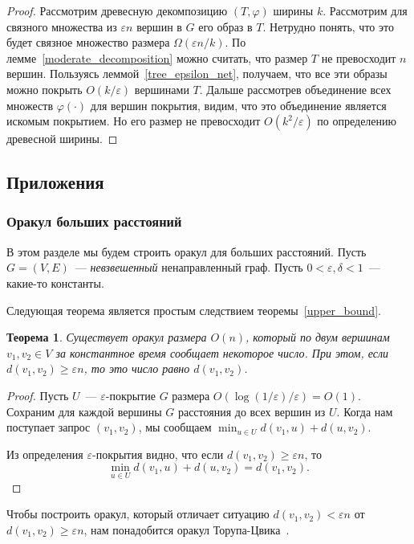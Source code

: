 \documentclass[12pt]{article}
\newcommand{\eps}{\varepsilon}
\newtheorem{theorem}{Теорема}
\begin{document}
\begin{proof}
        Рассмотрим древесную декомпозицию $(T, \varphi)$ ширины $k$. Рассмотрим для связного множества из $\eps n$
        вершин в $G$ его образ в $T$.
        Нетрудно понять, что это будет связное множество размера $\Omega(\eps n / k)$.
        По лемме~\ref{moderate_decomposition} можно считать, что размер $T$ не превосходит $n$ вершин. Пользуясь
        леммой~\ref{tree_epsilon_net}, получаем, что все эти образы можно покрыть $O(k / \eps)$ вершинами $T$.
        Дальше рассмотрев объединение всех множеств $\varphi(\cdot)$ для вершин покрытия, видим, что это объединение является
        искомым покрытием. Но его размер не превосходит $O(k^2 / \eps)$ по определению древесной ширины.
    \end{proof}
    \subsection{Приложения}
    \label{subsection_applications}
    \subsubsection{Оракул больших расстояний}
    \label{subsubsection_distance_oracle}
    В этом разделе мы будем строить оракул для больших расстояний.
    Пусть $G = (V, E)$~--- \emph{невзвешенный} ненаправленный граф.
    Пусть $0 < \eps, \delta < 1$~--- какие-то константы.

    Следующая теорема является простым следствием теоремы~\ref{upper_bound}.

    \begin{theorem}
        \label{naive_oracle}
        Существует оракул размера $O(n)$, который по двум вершинам $v_1, v_2 \in V$ за константное время сообщает некоторое
        число. При этом, если $d(v_1, v_2) \geq \eps n$, то это число равно $d(v_1, v_2)$.
    \end{theorem}
    \begin{proof}
        Пусть $U$~--- $\eps$-покрытие $G$ размера $O(\log(1 / \eps) / \eps) = O(1)$.
        Сохраним для каждой вершины $G$ расстояния до всех вершин из $U$.
        Когда нам поступает запрос $(v_1, v_2)$, мы сообщаем $\min_{u \in U} d(v_1, u) + d(u, v_2)$.

        Из определения $\eps$-покрытия видно, что если $d(v_1, v_2) \geq \eps n$, то 
        $$
            \min_{u \in U} d(v_1, u) + d(u, v_2) = d(v_1, v_2).
        $$
    \end{proof}

    Чтобы построить оракул, который отличает ситуацию $d(v_1, v_2) < \eps n$ от $d(v_1, v_2) \geq \eps n$,
    нам понадобится оракул Торупа-Цвика~\cite{TZ05}.
\end{document}
